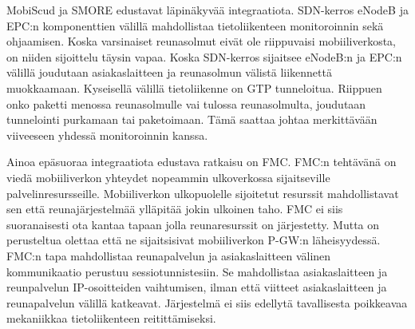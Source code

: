 MobiScud ja SMORE edustavat läpinäkyvää integraatiota. SDN-kerros eNodeB ja EPC:n komponenttien välillä mahdollistaa tietoliikenteen monitoroinnin sekä ohjaamisen. Koska varsinaiset reunasolmut eivät ole riippuvaisi mobiiliverkosta, on niiden sijoittelu täysin vapaa.
Koska SDN-kerros sijaitsee eNodeB:n ja EPC:n välillä joudutaan asiakaslaitteen ja reunasolmun välistä liikennettä muokkaamaan. Kyseisellä välillä tietoliikenne on GTP tunneloitua.
Riippuen onko paketti menossa reunasolmulle vai tulossa reunasolmulta, joudutaan tunnelointi purkamaan tai paketoimaan. Tämä saattaa johtaa merkittävään viiveeseen yhdessä monitoroinnin kanssa.

Ainoa epäsuoraa integraatiota edustava ratkaisu on FMC. FMC:n tehtävänä on viedä mobiiliverkon yhteydet nopeammin ulkoverkossa sijaitseville palvelinresursseille. Mobiiliverkon ulkopuolelle sijoitetut resurssit mahdollistavat sen että reunajärjestelmää ylläpitää jokin ulkoinen taho.
FMC ei siis suoranaisesti ota kantaa tapaan jolla reunaresurssit on järjestetty. Mutta on perusteltua olettaa että ne sijaitsisivat mobiiliverkon P-GW:n läheisyydessä.
FMC:n tapa mahdollistaa reunapalvelun ja asiakaslaitteen välinen kommunikaatio perustuu sessiotunnistesiin. Se mahdollistaa asiakaslaitteen ja reunpalvelun IP-osoitteiden vaihtumisen, ilman että viitteet asiakaslaitteen ja reunapalvelun välillä katkeavat. Järjestelmä ei siis edellytä tavallisesta poikkeavaa mekaniikkaa tietoliikenteen reitittämiseksi.
%
%
%
%
%
%

